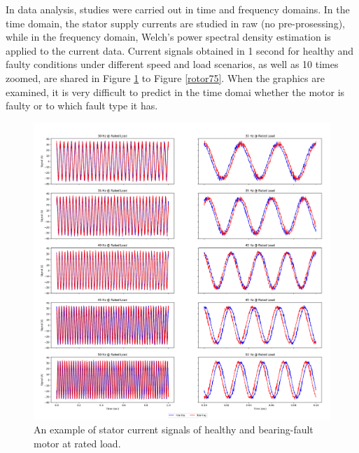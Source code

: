 In data analysis, studies were carried out in time and frequency domains. In the time domain, the stator supply currents are studied in raw (no pre-prosessing), while in the frequency domain, Welch's power spectral density estimation is applied to the current data. Current signals obtained in 1 second for healthy and faulty conditions under different speed and load scenarios, as well as 10 times zoomed, are shared in Figure \ref{bearing100} to Figure \ref{rotor75}. When the graphics are examined, it is very difficult to predict in the time domai whether the motor is faulty or to which fault type it has. 
\pagebreak
\begin{figure}[p]
	\centering
	\includegraphics[width=0.75\paperwidth,keepaspectratio=true]{./fig/bearing_100.png}
	\caption{An example of stator current signals of healthy and bearing-fault motor at rated load.}	
	\label{bearing100}
\end{figure}
\pagebreak
